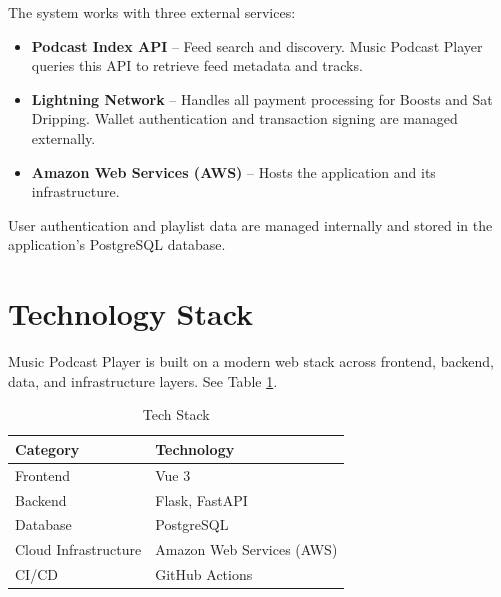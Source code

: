 \documentclass{article}
\begin{document}
The system works with three external services:

\begin{itemize}
    \item \textbf{Podcast Index API} -- Feed search and discovery. 
    Music Podcast Player queries this API to retrieve feed metadata and 
    tracks.
    \item \textbf{Lightning Network} -- Handles all payment processing for 
    Boosts and Sat Dripping. Wallet authentication and transaction 
    signing are managed externally.
    \item \textbf{Amazon Web Services (AWS)} -- Hosts the application and 
    its infrastructure.
\end{itemize}

User authentication and playlist data are managed internally and stored 
in the application's PostgreSQL database.

\section{Technology Stack}
Music Podcast Player is built on a modern web stack across frontend, 
backend, data, and infrastructure layers. See Table \ref{tab:Tech Stack}.

    \begin{table}[H]
        \centering
        \begin{tabular}{l l}
            \toprule
            Category & Technology\\
            \midrule
            Frontend & Vue 3 \\
            Backend & Flask, FastAPI \\
            Database & PostgreSQL \\
            Cloud Infrastructure & Amazon Web Services (AWS) \\
            CI/CD & GitHub Actions \\
            \bottomrule
        \end{tabular}
        \caption{Tech Stack}
        \label{tab:Tech Stack}
    \end{table}
\end{document}
